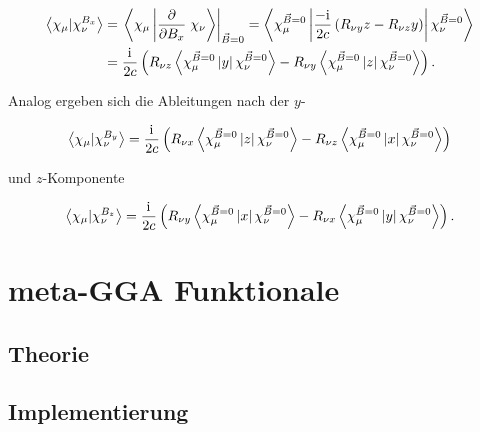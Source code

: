 	\begin{equation}
	\begin{aligned}
	  \left\langle\chi_\mu\vert\chi_\nu^{B_x}\right\rangle&=\left.\left\langle\chi_\mu\left|\frac{\partial}{\partial B_x}\right.\chi_\nu\right\rangle\right|_{\vec{B}=0}=\left\langle\chi_\mu^{\vec{B}=0}\left|\frac{-\mathrm{i}\mkern1mu}{2c}\left(R_{\nu y}z-R_{\nu z}y\right)\right|\chi_\nu^{\vec{B}=0}\right\rangle\\
	  &=\frac{\mathrm{i}\mkern1mu}{2c}\left(R_{\nu z}\left\langle\chi_\mu^{\vec{B}=0}\left|y\right|\chi_\nu^{\vec{B}=0}\right\rangle-R_{\nu y}\left\langle\chi_\mu^{\vec{B}=0}\left|z\right|\chi_\nu^{\vec{B}=0}\right\rangle\right).
	\end{aligned}
	\end{equation}
	
	Analog ergeben sich die Ableitungen nach der $y$- 
	
		\begin{equation}
	  \left\langle\chi_\mu\vert\chi_\nu^{B_y}\right\rangle=\frac{\mathrm{i}\mkern1mu}{2c}\left(R_{\nu x}\left\langle\chi_\mu^{\vec{B}=0}\left|z\right|\chi_\nu^{\vec{B}=0}\right\rangle-R_{\nu z}\left\langle\chi_\mu^{\vec{B}=0}\left|x\right|\chi_\nu^{\vec{B}=0}\right\rangle\right)
	\end{equation}
	
	und $z$-Komponente
	
		\begin{equation}
	  \left\langle\chi_\mu\vert\chi_\nu^{B_z}\right\rangle=\frac{\mathrm{i}\mkern1mu}{2c}\left(R_{\nu y}\left\langle\chi_\mu^{\vec{B}=0}\left|x\right|\chi_\nu^{\vec{B}=0}\right\rangle-R_{\nu x}\left\langle\chi_\mu^{\vec{B}=0}\left|y\right|\chi_\nu^{\vec{B}=0}\right\rangle\right).
	\end{equation}

\section{meta-GGA Funktionale}
	\subsection{Theorie}
	\subsection{Implementierung}
	
	